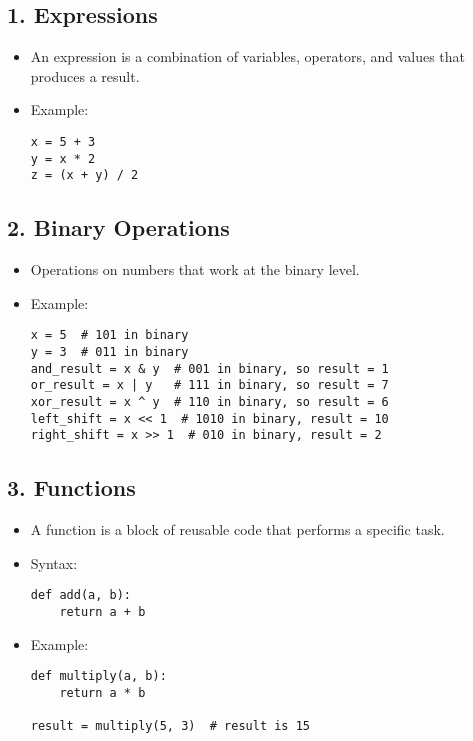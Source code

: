 
\subsection*{1. Expressions}
\begin{itemize}
    \item An expression is a combination of variables, operators, and values that produces a result.
    \item Example: 
    \begin{verbatim}
x = 5 + 3  
y = x * 2  
z = (x + y) / 2  
    \end{verbatim}
\end{itemize}

\subsection*{2. Binary Operations}
\begin{itemize}
    \item Operations on numbers that work at the binary level.
    \item Example:
    \begin{verbatim}
x = 5  # 101 in binary
y = 3  # 011 in binary
and_result = x & y  # 001 in binary, so result = 1
or_result = x | y   # 111 in binary, so result = 7
xor_result = x ^ y  # 110 in binary, so result = 6
left_shift = x << 1  # 1010 in binary, result = 10
right_shift = x >> 1  # 010 in binary, result = 2
    \end{verbatim}
\end{itemize}

\subsection*{3. Functions}
\begin{itemize}
    \item A function is a block of reusable code that performs a specific task.
    \item Syntax:
    \begin{verbatim}
def add(a, b):
    return a + b
    \end{verbatim}
    \item Example:
    \begin{verbatim}
def multiply(a, b):
    return a * b

result = multiply(5, 3)  # result is 15
    \end{verbatim}
\end{itemize}

